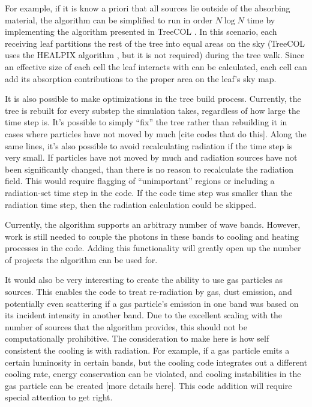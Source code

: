 For example, if it is know a priori that all sources lie outside of the absorbing material, the algorithm can be simplified to run in order $N\log{N}$ time by implementing the algorithm presented in TreeCOL \citep{clarkEt12}. In this scenario, each receiving leaf partitions the rest of the tree into equal areas on the sky (TreeCOL uses the HEALPIX algorithm \citep{gorskiEt05}, but it is not required) during the tree walk. Since an effective size of each cell the leaf interacts with can be calculated, each cell can add its absorption contributions to the proper area on the leaf's sky map.

It is also possible to make optimizations in the tree build process. Currently, the tree is rebuilt for every substep the simulation takes, regardless of how large the time step is. It's possible to simply ``fix'' the tree rather than rebuilding it in cases where particles have not moved by much [cite codes that do this]. Along the same lines, it's also possible to avoid recalculating radiation if the time step is very small. If particles have not moved by much and radiation sources have not been significantly changed, than there is no reason to recalculate the radiation field. This would require flagging of ``unimportant'' regions or including a radiation-set time step in the code. If the code time step was smaller than the radiation time step, then the radiation calculation could be skipped.

Currently, the algorithm supports an arbitrary number of wave bands. However, work is still needed to couple the photons in these bands to cooling and heating processes in the code. Adding this functionality will greatly open up the number of projects the algorithm can be used for.

It would also be very interesting to create the ability to use gas particles as sources. This enables the code to treat re-radiation by gas, dust emission, and potentially even scattering if a gas particle's emission in one band was based on its incident intensity in another band. Due to the excellent scaling with the number of sources that the algorithm provides, this should not be computationally prohibitive. The consideration to make here is how self consistent the cooling is with radiation. For example, if a gas particle emits a certain luminosity in certain bands, but the cooling code integrates out a different cooling rate, energy conservation can be violated, and cooling instabilities in the gas particle can be created [more details here]. This code addition will require special attention to get right.


